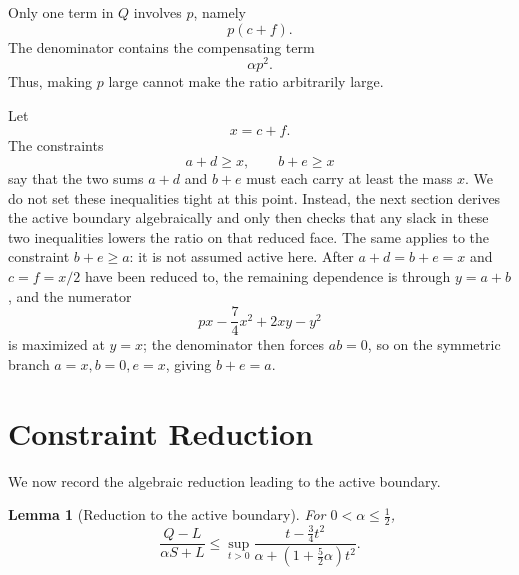 \documentclass[11pt]{article}
\newtheorem{lemma}{Lemma}
\begin{document}
Only one term in \(Q\) involves \(p\), namely
\[
p(c+f).
\]
The denominator contains the compensating term
\[
\alpha p^2.
\]
Thus, making \(p\) large cannot make the ratio
arbitrarily large.

Let
\[
x=c+f.
\]
The constraints
\[
a+d\ge x,\qquad b+e\ge x
\]
say that the two sums \(a+d\) and \(b+e\) must each carry at least the
mass \(x\).  We do not set these inequalities tight at this point.
Instead, the next section derives the active boundary algebraically and
only then checks that any slack in these two inequalities lowers the
ratio on that reduced face.
The same applies to the constraint \(b+e\ge a\): it is not assumed
active here.  After \(a+d=b+e=x\) and \(c=f=x/2\) have been reduced to,
the remaining dependence is through \(y=a+b\), and the numerator
\[
px-\frac74x^2+2xy-y^2
\]
is maximized at \(y=x\); the denominator then forces \(ab=0\), so on
the symmetric branch \(a=x,b=0,e=x\), giving \(b+e=a\).

\section{Constraint Reduction}

We now record the algebraic reduction leading to the active boundary.

\begin{lemma}[Reduction to the active boundary]
For \(0<\alpha\le \frac12\),
\[
\frac{Q-L}{\alpha S+L}
\le
\sup_{t>0}
\frac{t-\frac34t^2}{\alpha+\left(1+\frac52\alpha\right)t^2}.
\]
\end{lemma}
\end{document}
